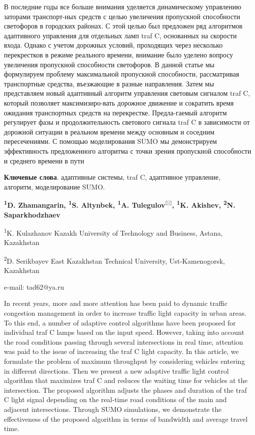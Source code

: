 В последние годы все больше внимания уделяется динамическому управлению
заторами транспорт-ных средств с целью увеличения пропускной способности
светофоров в городских районах. С этой целью был предложен ряд
алгоритмов адаптивного управления для отдельных ламп traf C, основанных
на скорости входа. Однако с учетом дорожных условий, проходящих через
несколько перекрестков в режиме реального времени, внимание было уделено
вопросу увеличения пропускной способности светофоров. В данной статье мы
формулируем проблему максимальной пропускной способности, рассматривая
транспортные средства, въезжающие в разные направления. Затем мы
представляем новый адаптивный алгоритм управления световым сигналом traf
C, который позволяет максимизиро-вать дорожное движение и сократить время
ожидания транспортных средств на перекрестке. Предла-гаемый алгоритм
регулирует фазы и продолжительность светового сигнала traf C в
зависимости от дорожной ситуации в реальном времени между основным и
соседним пересечениями. С помощью моделирования SUMO мы демонстрируем
эффективность предложенного алгоритма с точки зрения пропускной
способности и среднего времени в пути

{\bfseries Ключевые слова}. адаптивные системы, traf C, адаптивное
управление, алгоритм, моделирование SUMO.


\begin{center}
{\bfseries \textsuperscript{1}D. Zhamangarin, \textsuperscript{1}S.
Altynbek, \textsuperscript{1}A. Tulegulov}\textsuperscript{🖂}{\bfseries ,
\textsuperscript{1}K. Akishev, \textsuperscript{2}N. Saparkhodzhaev}

\textsuperscript{1}K. Kulazhanov Kazakh University of Technology and
Business, Astana, Kazakhstan

\textsuperscript{2}D. Serikbayev East Kazakhstan Technical University,
Ust-Kamenogorsk, Kazakhstan

e-mail: tad62@ya.ru
\end{center}

In recent years, more and more attention has been paid to dynamic
traffic congestion management in order to increase traffic light
capacity in urban areas. To this end, a number of adaptive control
algorithms have been proposed for individual traf C lamps based on the
input speed. However, taking into account the road conditions passing
through several intersections in real time, attention was paid to the
issue of increasing the traf C light capacity. In this article, we
formulate the problem of maximum throughput by considering vehicles
entering in different directions. Then we present a new adaptive traffic
light control algorithm that maximizes traf C and reduces the waiting
time for vehicles at the intersection. The proposed algorithm adjusts
the phases and duration of the traf C light signal depending on the
real-time road conditions of the main and adjacent intersections.
Through SUMO simulations, we demonstrate the effectiveness of the
proposed algorithm in terms of bandwidth and average travel time.

